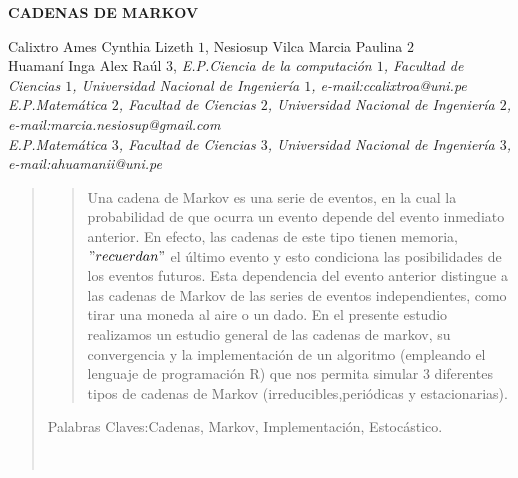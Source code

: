 \documentclass[10pt,a4paper]{article}
\theoremstyle{definition}
\theoremstyle{remark}
\begin{document}
\begin{center}
 {\Large \textbf{CADENAS DE MARKOV}}
\end{center}
\begin{center}
Calixtro Ames Cynthia Lizeth $1$, Nesiosup Vilca Marcia Paulina $2$\\
Huamaní Inga Alex Raúl $3$, \vskip12pt
{\it E.P.Ciencia de la computación $1$, Facultad de Ciencias $1$, Universidad Nacional 
de Ingeniería $1$, e-mail:ccalixtroa@uni.pe \\E.P.Matemática $2$, Facultad de Ciencias 
$2$, Universidad Nacional de Ingeniería $2$, e-mail:marcia.nesiosup@gmail.com \\ 
E.P.Matemática $3$, Facultad de Ciencias $3$, Universidad Nacional de Ingeniería $3$,  
\\e-mail:ahuamanii@uni.pe}
\end{center}
\begin{quotation}
{\small
\begin{abstract}
\noindent  Una cadena de Markov es una serie de eventos, en la cual la probabilidad de que ocurra un evento depende del evento inmediato anterior. En efecto, las cadenas de este tipo tienen memoria, $"recuerdan"$ el último evento y esto condiciona las posibilidades de los eventos futuros. Esta dependencia del evento anterior distingue a las cadenas de Markov de las series de eventos independientes, como tirar una moneda al aire o un dado. En el presente estudio realizamos un estudio general de las cadenas de markov, su convergencia y la implementación de un algoritmo (empleando el lenguaje de programación R) que nos permita simular 3 diferentes tipos de cadenas de Markov (irreducibles,periódicas y estacionarias).

\end{abstract}
\hspace*{0.5cm} Palabras Claves:Cadenas, Markov, Implementación, Estocástico.  
}\\

\end{quotation}
\end{document}
